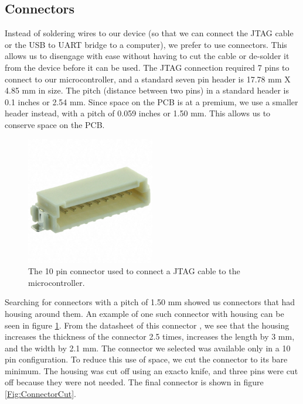\subsection{Connectors}
\label{Sec:Connetors}
Instead of soldering wires to our device (so that we can connect the JTAG cable or the USB to UART bridge to a computer), we prefer to use connectors. This allows us to disengage with ease without having to cut the cable or de-solder it from the device before it can be used. The JTAG connection required 7 pins to connect to our microcontroller, and a standard seven pin header is 17.78 mm X 4.85 mm in size. The pitch (distance between two pins) in a standard header is 0.1 inches or 2.54 mm. Since space on the PCB is at a premium, we use a smaller header instead, with a pitch of 0.059 inches or 1.50 mm. This allows us to conserve space on the PCB.
\begin{figure}
\begin{center}
\includegraphics[width=0.5\textwidth]{images/ConnectorWhole.JPG}
\caption{The 10 pin connector used to connect a JTAG cable to the microcontroller.}
\label{Fig:ConnectorWhole}
\end{center}
\end{figure}
Searching for connectors with a pitch of 1.50 mm showed us connectors that had housing around them.
An example of one such connector with housing can be seen in figure \ref{Fig:ConnectorWhole}.
From the datasheet of this connector \cite{Datasheet:TEConnHeader},
we see that the housing increases the thickness of the connector 2.5 times,
increases the length by 3 mm,
and the width by 2.1 mm. The connector we selected was available only in a 10 pin configuration.
To reduce this use of space, we cut the connector to its bare minimum.
The housing was cut off using an exacto knife,
and three pins were cut off because they were not needed.
The final connector is shown in figure \ref{Fig:ConnectorCut}.
